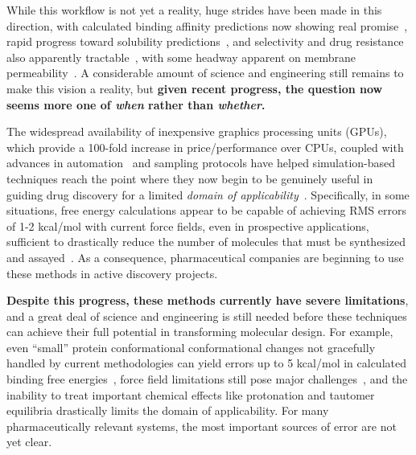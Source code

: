 \documentclass[11pt]{article}
\begin{document}
While this workflow is not yet a reality, huge strides have been made in this direction, with calculated binding affinity predictions now showing real promise~\cite{mobley_perspective_2012, christ_accuracy_2014, deng_distinguishing_2015, sherborne_preprint_2016, schrodinger_accurate_2015, christ_binding_2016, cui_affinity_2016, verras_free_2016}, rapid progress toward solubility predictions~\cite{schnieders_structure_2012, park_absolute_2014, liu_using_2016}, and selectivity and drug resistance also apparently tractable~\cite{leonis_contribution_2013}, with some headway apparent on membrane permeability~\cite{lee_permeability_2016, comer_permeability_2014}. 
A considerable amount of science and engineering still remains to make this vision a reality, but \textbf{given recent progress, the question now seems more one of \emph{when} rather than \emph{whether}.} 

The widespread availability of inexpensive graphics processing units (GPUs), which provide a 100-fold increase in price/performance over CPUs, coupled with advances in automation~\cite{liu_lead_2013} and sampling protocols have helped simulation-based techniques reach the point where they now begin to be genuinely useful in guiding drug discovery for a limited \emph{domain of applicability}~\cite{mikulskis_large-scale_2014, homeyer_binding_2014, sherborne_preprint_2016,  schrodinger_accurate_2015, christ_binding_2016, cui_affinity_2016, verras_free_2016}.
Specifically, in some situations, free energy calculations appear to be capable of achieving RMS errors of 1-2 kcal/mol with current force fields, even in prospective applications, sufficient to drastically reduce the number of molecules that must be synthesized and assayed~\cite{shirts-mobley-brown}.
As a consequence, pharmaceutical companies are beginning to use these methods in active discovery projects.

\textbf{Despite this progress, these methods currently have severe limitations}, and a great deal of science and engineering is still needed before these techniques can achieve their full potential in transforming molecular design.
For example, even ``small'' protein conformational conformational changes not gracefully handled by current methodologies can yield errors up to 5 kcal/mol in calculated binding free energies~\cite{lim_sensitivity_2016}, force field limitations still pose major challenges~\cite{rocklin_blind_2013}, and the inability to treat important chemical effects like protonation and tautomer equilibria drastically limits the domain of applicability.
For many pharmaceutically relevant systems, the most important sources of error are not yet clear.
\end{document}
